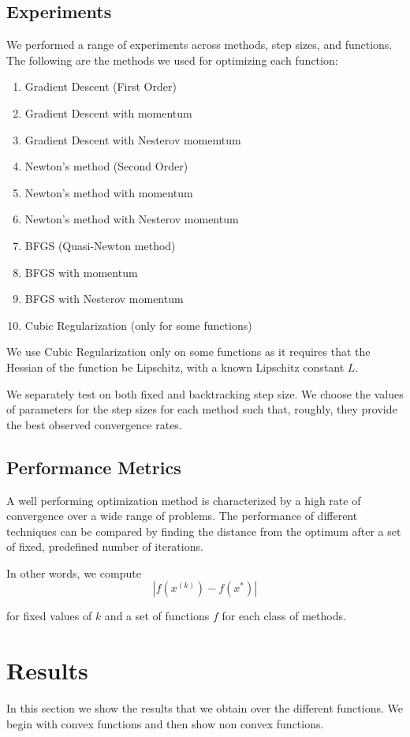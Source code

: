\documentclass{article}
\begin{document}
\subsection{Experiments}
We performed a range of experiments across methods, step sizes, and functions. The following are the methods we used for optimizing each function:
\begin{enumerate}
	\item Gradient Descent (First Order)
	\item Gradient Descent with momentum
	\item Gradient Descent with Nesterov momemtum
	\item Newton's method (Second Order)
	\item Newton's method with momentum 
	\item Newton's method with Nesterov momentum
	\item BFGS (Quasi-Newton method)
	\item BFGS with momentum
	\item BFGS with Nesterov momentum
	\item Cubic Regularization (only for some functions)
\end{enumerate}

We use Cubic Regularization only on some functions as it requires that the Hessian of the function be Lipschitz, with a known Lipschitz constant $L$.

We separately test on both fixed and backtracking step size. We choose the values of parameters for the step sizes for each method such that, roughly, they provide the best observed convergence rates.

\subsection{Performance Metrics}
A well performing optimization method is characterized by a high rate of convergence over a wide range of problems. The performance of different techniques can be compared by finding the distance from the optimum after a set of fixed, predefined number of iterations.

In other words, we compute
\begin{equation}
|f(x^{(k)}) - f(x^*)|
\end{equation}

for fixed values of $k$ and a set of functions $f$ for each class of methods.

\section{Results}\label{results}
In this section we show the results that we obtain over the different functions. We begin with convex functions and then show non convex functions.
\end{document}
